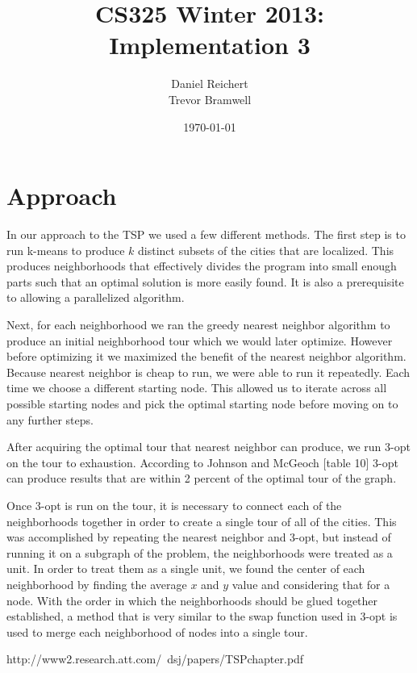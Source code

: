 \documentclass[12pt]{article}
\title{CS325 Winter 2013: Implementation 3}
\author{
    Daniel Reichert \\
    Trevor Bramwell
}
\date{\today}
\begin{document}
\maketitle

\section*{Approach}

In our approach to the TSP we used a few different methods.  The first step is
to run k-means to produce $k$ distinct subsets of the cities that are
localized.  This produces neighborhoods that effectively divides the program
into small enough parts such that an optimal solution is more easily found.  It
is also a prerequisite to allowing a parallelized algorithm.  

Next, for each neighborhood we ran the greedy nearest neighbor algorithm to
produce an initial neighborhood tour which we would later optimize. However
before optimizing it we maximized the benefit of the nearest neighbor
algorithm. Because nearest neighbor is cheap to run, we were able to run it
repeatedly. Each time we choose a different starting node. This allowed us to
iterate across all possible starting nodes and pick the optimal starting node
before moving on to any further steps.

After acquiring the optimal tour that nearest neighbor can produce, we run
3-opt on the tour to exhaustion. According to Johnson and McGeoch [table 10]
3-opt can produce results that are within 2 percent of the optimal tour of the
graph.

Once 3-opt is run on the tour, it is necessary to connect each of the
neighborhoods together in order to create a single tour of all of the cities.
This was accomplished by repeating the nearest neighbor and 3-opt, but instead
of running it on a subgraph of the problem, the neighborhoods were treated as a
unit.  In order to treat them as a single unit, we found the center of each
neighborhood by finding the average $x$ and $y$ value and considering that for
a node.  With the order in which the neighborhoods should be glued together
established, a method that is very similar to the swap function used in 3-opt
is used to merge each neighborhood of nodes into a single tour.



http://www2.research.att.com/~dsj/papers/TSPchapter.pdf
\end{document}
